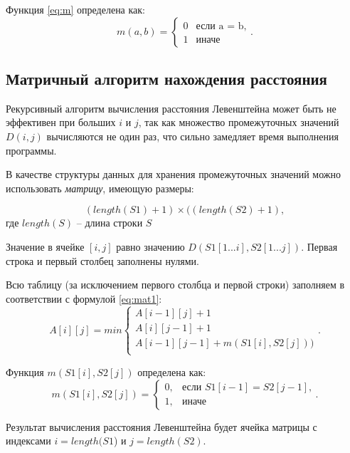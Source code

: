 Функция \ref{eq:m} определена как:
\begin{equation}
	\label{eq:m}
	m(a, b) = \begin{cases}
		0 &\text{если a = b,}\\
		1 &\text{иначе}
	\end{cases}.
\end{equation}

\subsection{Матричный алгоритм нахождения расстояния}

Рекурсивный алгоритм вычисления расстояния Левенштейна может быть не эффективен при больших $i$ и $j$, так как множество промежуточных значений $D(i, j)$ вычисляются не один раз, что сильно замедляет время выполнения программы.

В качестве структуры данных для хранения промежуточных значений можно использовать \textit{матрицу}, имеющую  размеры:

\begin{equation}
	(length(S1)+ 1) \times ((length(S2) + 1),
\end{equation}
где $length(S)$ -- длина строки $S$

Значение в ячейке $[i, j]$ равно значению $D(S1[1...i], S2[1...j])$. Первая строка и первый столбец заполнены нулями.

Всю таблицу (за исключением первого столбца и первой строки) заполняем в соответствии с формулой \ref{eq:mat1}:
\begin{equation}
	\label{eq:mat1}
	A[i][j] = min \begin{cases}
		A[i-1][j] + 1\\
		 A[i][j-1] + 1\\
		 A[i-1][j-1] + m(S1[i], S2[j]))\\
	 \end{cases}.
 \end{equation}

Функция $m(S1[i], S2[j])$ определена как:
\begin{equation}
\label{eq:m2}
m(S1[i], S2[j]) = \begin{cases}
0, &\text{если $S1[i - 1] = S2[j - 1]$,}\\
1, &\text{иначе}
\end{cases}.
\end{equation}

Результат вычисления расстояния Левенштейна будет ячейка матрицы с индексами $i = length(S1$) и $j = length(S2)$.

